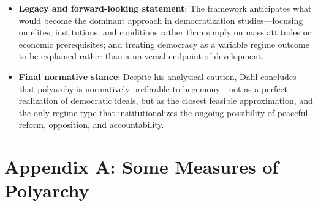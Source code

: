 \documentclass[12pt]{article}
\begin{document}
\begin{itemize}[leftmargin=*, itemsep=4pt]
    \item \textbf{Legacy and forward-looking statement}: The framework anticipates what would become the dominant approach in democratization studies---focusing on elites, institutions, and conditions rather than simply on mass attitudes or economic prerequisites; and treating democracy as a variable regime outcome to be explained rather than a universal endpoint of development.
    \item \textbf{Final normative stance}: Despite his analytical caution, Dahl concludes that polyarchy is normatively preferable to hegemony---not as a perfect realization of democratic ideals, but as the closest feasible approximation, and the only regime type that institutionalizes the ongoing possibility of peaceful reform, opposition, and accountability.
\end{itemize}

\section{Appendix A: Some Measures of Polyarchy}
\end{document}
